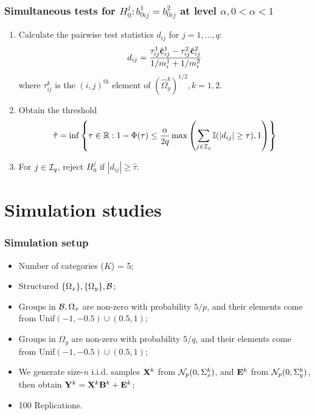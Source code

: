 \documentclass[10pt]{beamer}
\theoremstyle{definition}
\DeclareMathOperator*{\Th}{\text{th}}
\begin{document}
\begin{frame}
\frametitle{Simultaneous tests for $H_0^{j}: b_{0 ij}^1 = b_{0 ij}^2$ at level $\alpha, 0< \alpha< 1$}

\begin{enumerate}
\item Calculate the pairwise test statistics $d_{ij}$ for $j = 1, \ldots, q$:
%
\[
d_{ij} = \frac{\tau_{ij}^1 \hat {{\bf{c}}}_{ij}^1 - \tau_{ij}^2 \hat {{\bf{c}}}_{ij}^2}{1/m_i^1 + 1/m_i^2}
\]
%
where $\tau_{ij}^k$ is the $(i,j)^{\Th}$ element of $(\hat \Omega_y^k)^{1/2}, k=1,2$.

\item Obtain the threshold
%
$$
\hat \tau = \inf \left\{\tau \in {\mathbb{R}}: 1 - \Phi(\tau) \leq \frac{\alpha}{2 q}
\max \left( \sum_{j \in {\cal{I}}_q} {\mathbb{I}}( |d_{ij}| \geq \tau), 1 \right) \right\}
$$
%

\item For $j \in {\cal{I}}_q$, reject $H_0^{j}$ if $|d_{ij}| \geq \hat \tau$.
\end{enumerate} 

\end{frame}
\section{Simulation studies}

\begin{frame}
\frametitle{Simulation setup}
\begin{itemize}
\item Number of categories ($K$) = 5;

\item Structured $\{ \Omega_x\}, \{\Omega_y\}, {\cal{B}}$;

\item Groups in ${\cal{B}},\Omega_x$ are non-zero with probability $5/p$, and their elements come from Unif$(-1, -0.5) \cup (0.5,1)$;

\item Groups in $\Omega_y$ are non-zero with probability $5/q$, and their elements come from Unif$(-1, -0.5) \cup (0.5,1)$;

\item We generate size-$n$ i.i.d. samples ${\mathbf{X}}^k$ from ${\cal{N}}_p(0, \Sigma_x^k)$, and ${\mathbf{E}}^k$ from ${\cal{N}}_p(0, \Sigma_y^k)$, then obtain ${\mathbf{Y}}^k = {\mathbf{X}}^k {\mathbf{B}}^k + {\mathbf{E}}^k$;
\item 100 Replications.

\end{itemize}
\end{frame}
\end{document}
